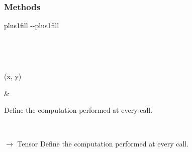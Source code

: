 \documentclass[letterpaper,10pt,english]{sphinxmanual}
\begin{document}
\begin{fulllineitems}
\begin{itemize}
\end{itemize}
\subsubsection*{Methods}


\begin{savenotes}
\sphinxatlongtablestart
\sphinxthistablewithglobalstyle
\sphinxthistablewithnovlinesstyle
\makeatletter
  \LTleft \@totalleftmargin plus1fill
  \LTright\dimexpr\columnwidth-\@totalleftmargin-\linewidth\relax plus1fill
\makeatother
\begin{longtable}{}
\sphinxtoprule
\endfirsthead

\\
\sphinxtoprule
\endhead

\sphinxbottomrule
{}\\
\endfoot

\endlastfoot
\sphinxtableatstartofbodyhook
\begin{varwidth}[t]{}
\sphinxAtStartPar
{\hyperref[\detokenize{dtw_loss_functions.soft_dtw_implementations.soft_dtw_cuda_ron.module:dtw_loss_functions.soft_dtw_implementations.soft_dtw_cuda_ron.module.SoftDTW.forward}]{}}(x, y)
\sphinxbeforeendvarwidth
\end{varwidth}%
&\begin{varwidth}[t]{}
\sphinxAtStartPar
Define the computation performed at every call.
\sphinxbeforeendvarwidth
\end{varwidth}%
\\
\sphinxbottomrule
\end{longtable}
\sphinxtableafterendhook
\sphinxatlongtableend
\end{savenotes}

\begin{fulllineitems}
\label{\detokenize{dtw_loss_functions.soft_dtw_implementations.soft_dtw_cuda_ron.module:dtw_loss_functions.soft_dtw_implementations.soft_dtw_cuda_ron.module.SoftDTW.forward}}
\pysigstartsignatures
\pysiglinewithargsret
{}
{\sphinxparamcomma {}}
{{ $\rightarrow$ Tensor}}
\pysigstopsignatures
\sphinxAtStartPar
Define the computation performed at every call.


\end{fulllineitems}
\end{fulllineitems}
\end{document}
